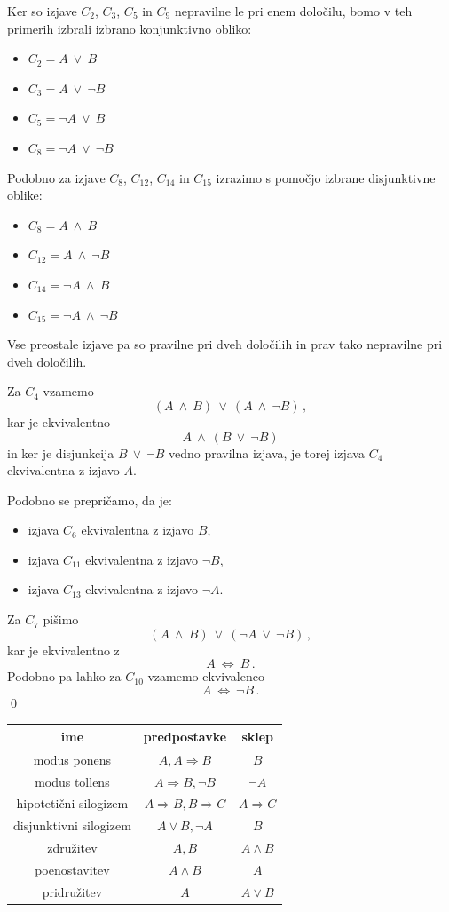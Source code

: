 \documentclass[11pt,paper=b5,DIV=13,headinclude,footinclude]{scrbook}
\def\ali {{~\vee~}}
\def\inn {{~\wedge~}}
\def\cee {{~\Leftrightarrow~}}
\begin{document}
Ker so izjave $C_2$, $C_3$, $C_5$ in $C_9$ nepravilne le pri enem določilu, bomo v teh primerih izbrali
izbrano konjunktivno obliko:
\begin{itemize}
  \item $C_2 = A\ali B$
  \item $C_3 = A\ali \neg B$
  \item $C_5 = \neg A\ali B$
  \item $C_8 = \neg A\ali \neg B$
\end{itemize}
Podobno za izjave $C_{8}$, $C_{12}$, $C_{14}$ in $C_{15}$ izrazimo s pomočjo izbrane disjunktivne oblike:
\begin{itemize}
  \item $C_8 = A\inn B$
  \item $C_{12} = A\inn\neg B$
  \item $C_{14} = \neg A\inn B$
  \item $C_{15} = \neg A\inn\neg B$
\end{itemize}
Vse preostale izjave pa so pravilne pri dveh določilih in prav tako nepravilne pri dveh določilih.

Za $C_4$ vzamemo $$(A\inn B) \ali (A\inn \neg B)\,,$$
kar je ekvivalentno
$$A\inn (B \ali \neg B)$$
in ker je disjunkcija $B \ali \neg B$ vedno pravilna izjava, je torej izjava $C_4$ ekvivalentna z izjavo $A$.

Podobno se prepričamo, da je:
\begin{itemize}
  \item  izjava $C_6$ ekvivalentna z izjavo $B$,
  \item  izjava $C_{11}$ ekvivalentna z izjavo $\neg B$,
  \item  izjava $C_{13}$ ekvivalentna z izjavo $\neg A$.
\end{itemize}
Za $C_7$ pišimo
$$(A\inn B) \ali (\neg A\ali \neg B)\,,$$
kar je ekvivalentno z
$$A\cee B\,.$$
Podobno pa lahko za $C_{10}$ vzamemo ekvivalenco
$$A\cee \neg B\,.$$
\qed


\begin{tabular}{|c|c|c|}
	\hline 
	ime & predpostavke & sklep\\
	\hline 
	\hline 
	modus ponens & $A,A\Rightarrow B$ & $B$\\
	\hline 
	modus tollens & $A\Rightarrow B,\neg B$ & $\neg A$\\
	\hline 
	hipoteti\v{c}ni silogizem & $A\Rightarrow B,B\Rightarrow C$ & $A\Rightarrow C$\\
	\hline 
	disjunktivni silogizem & $A\vee B,\neg A$ & $B$\\
	\hline 
	združitev  & $A,B$ & $A\wedge B$\\
	\hline 
	poenostavitev & $A\wedge B$ & $A$\\
	\hline 
	pridružitev & $A$ & $A\vee B$\\
	\hline 
\end{tabular}
\end{document}
